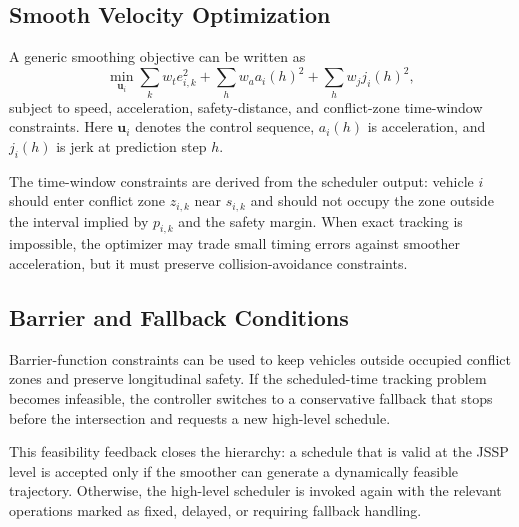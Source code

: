 \subsection{Smooth Velocity Optimization}
A generic smoothing objective can be written as
\begin{equation}
  \min_{\bm{u}_i} \sum_k w_t e_{i,k}^2 + \sum_h w_a a_i(h)^2 + \sum_h w_j j_i(h)^2,
  \label{eq:smoother_objective}
\end{equation}
subject to speed, acceleration, safety-distance, and conflict-zone time-window constraints. Here $\bm{u}_i$ denotes the control sequence, $a_i(h)$ is acceleration, and $j_i(h)$ is jerk at prediction step $h$.

\begin{addedblock}
The time-window constraints are derived from the scheduler output: vehicle $i$ should enter conflict zone $z_{i,k}$ near $s_{i,k}$ and should not occupy the zone outside the interval implied by $p_{i,k}$ and the safety margin. When exact tracking is impossible, the optimizer may trade small timing errors against smoother acceleration, but it must preserve collision-avoidance constraints.
\end{addedblock}

\subsection{Barrier and Fallback Conditions}
Barrier-function constraints can be used to keep vehicles outside occupied conflict zones and preserve longitudinal safety. If the scheduled-time tracking problem becomes infeasible, the controller switches to a conservative fallback that stops before the intersection and requests a new high-level schedule.

\begin{addedblock}
This feasibility feedback closes the hierarchy: a schedule that is valid at the JSSP level is accepted only if the smoother can generate a dynamically feasible trajectory. Otherwise, the high-level scheduler is invoked again with the relevant operations marked as fixed, delayed, or requiring fallback handling.
\end{addedblock}





